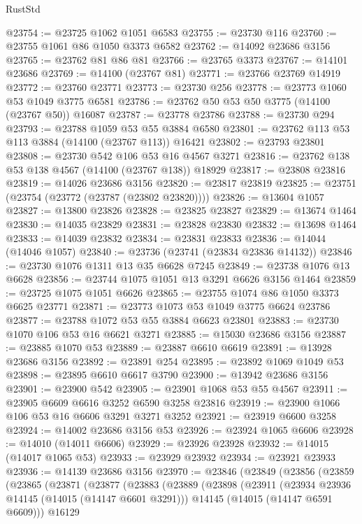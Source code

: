 \begin{lexlean}{RustStd}
\begin{coremodule}
@23754 := @23725 @1062 @1051 @6583
@23755 := @23730 @116
@23760 := @23755 @1061 @86 @1050 @3373 @6582
@23762 := @14092 @23686 @3156
@23765 := @23762 @81 @86 @81
@23766 := @23765 @3373
@23767 := @14101 @23686
@23769 := @14100 (@23767 @81)
@23771 := @23766 @23769 @14919
@23772 := @23760 @23771
@23773 := @23730 @256
@23778 := @23773 @1060 @53 @1049 @3775 @6581
@23786 := @23762 @50 @53 @50 @3775 (@14100 (@23767 @50)) @16087
@23787 := @23778 @23786
@23788 := @23730 @294
@23793 := @23788 @1059 @53 @55 @3884 @6580
@23801 := @23762 @113 @53 @113 @3884 (@14100 (@23767 @113)) @16421
@23802 := @23793 @23801
@23808 := @23730 @542 @106 @53 @16 @4567 @3271
@23816 := @23762 @138 @53 @138 @4567 (@14100 (@23767 @138)) @18929
@23817 := @23808 @23816
@23819 := @14026 @23686 @3156
@23820 := @23817 @23819
@23825 := @23751 (@23754 (@23772 (@23787 (@23802 @23820))))
@23826 := @13604 @1057
@23827 := @13800 @23826
@23828 := @23825 @23827
@23829 := @13674 @1464
@23830 := @14035 @23829
@23831 := @23828 @23830
@23832 := @13698 @1464
@23833 := @14039 @23832
@23834 := @23831 @23833
@23836 := @14044 (@14046 @1057)
@23840 := @23736 (@23741 (@23834 @23836 @14132))
@23846 := @23730 @1076 @1311 @13 @35 @6628 @7245
@23849 := @23738 @1076 @13 @6628
@23856 := @23744 @1075 @1051 @13 @3291 @6626 @3156 @1464
@23859 := @23725 @1075 @1051 @6626
@23865 := @23755 @1074 @86 @1050 @3373 @6625 @23771
@23871 := @23773 @1073 @53 @1049 @3775 @6624 @23786
@23877 := @23788 @1072 @53 @55 @3884 @6623 @23801
@23883 := @23730 @1070 @106 @53 @16 @6621 @3271
@23885 := @15030 @23686 @3156
@23887 := @23885 @1070 @53
@23889 := @23887 @6610 @6619
@23891 := @13928 @23686 @3156
@23892 := @23891 @254
@23895 := @23892 @1069 @1049 @53
@23898 := @23895 @6610 @6617 @3790
@23900 := @13942 @23686 @3156
@23901 := @23900 @542
@23905 := @23901 @1068 @53 @55 @4567
@23911 := @23905 @6609 @6616 @3252 @6590 @3258 @23816
@23919 := @23900 @1066 @106 @53 @16 @6606 @3291 @3271 @3252
@23921 := @23919 @6600 @3258
@23924 := @14002 @23686 @3156 @53
@23926 := @23924 @1065 @6606
@23928 := @14010 (@14011 @6606)
@23929 := @23926 @23928
@23932 := @14015 (@14017 @1065 @53)
@23933 := @23929 @23932
@23934 := @23921 @23933
@23936 := @14139 @23686 @3156
@23970 := @23846
    (@23849
      (@23856
        (@23859
          (@23865
            (@23871
              (@23877
                (@23883
                  (@23889
                    (@23898
                      (@23911
                        (@23934 @23936 @14145 (@14015 (@14147 @6601 @3291)))
                        @14145
                        (@14015 (@14147 @6591 @6609)))
                      @16129

\end{coremodule}
\end{lexlean}

